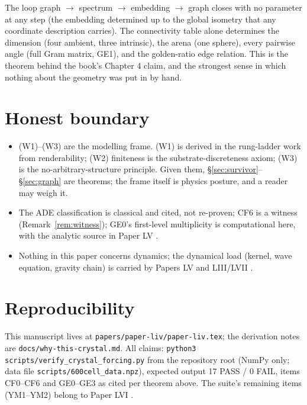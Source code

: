 \documentclass[12pt]{article}
\theoremstyle{definition}
\theoremstyle{remark}
\begin{document}
The loop graph $\to$ spectrum $\to$ embedding $\to$ graph closes with no parameter at any step (the embedding determined up to the global isometry that any coordinate description carries). The connectivity table alone determines the dimension (four ambient, three intrinsic), the arena (one sphere), every pairwise angle (full Gram matrix, GE1), and the golden-ratio edge relation. This is the theorem behind the book's Chapter 4 claim, and the strongest sense in which nothing about the geometry was put in by hand.

\section{Honest boundary}\label{sec:honest}

\begin{itemize}
\item (W1)--(W3) are the modelling frame. (W1) is derived in the rung-ladder work from renderability; (W2) finiteness is the substrate-discreteness axiom; (W3) is the no-arbitrary-structure principle. Given them, \S\ref{sec:survivor}--\S\ref{sec:graph} are theorems; the frame itself is physics posture, and a reader may weigh it.
\item The ADE classification is classical and cited, not re-proven; CF6 is a witness (Remark~\ref{rem:witness}); GE0's first-level multiplicity is computational here, with the analytic source in Paper LV \citep{SmartLV}.
\item Nothing in this paper concerns dynamics; the dynamical load (kernel, wave equation, gravity chain) is carried by Papers LV \citep{SmartLV} and LIII/LVII \citep{SmartLIII, SmartLVII}.
\end{itemize}

\section{Reproducibility}\label{sec:repro}

This manuscript lives at \texttt{papers/paper-liv/paper-liv.tex}; the derivation notes are \texttt{docs/why-this-crystal.md}. All claims: \texttt{python3 scripts/verify\_crystal\_forcing.py} from the repository root (NumPy only; data file \texttt{scripts/600cell\_data.npz}), expected output 17 PASS / 0 FAIL, items CF0--CF6 and GE0--GE3 as cited per theorem above. The suite's remaining items (YM1--YM2) belong to Paper LVI \citep{SmartLVI}.



\end{document}
